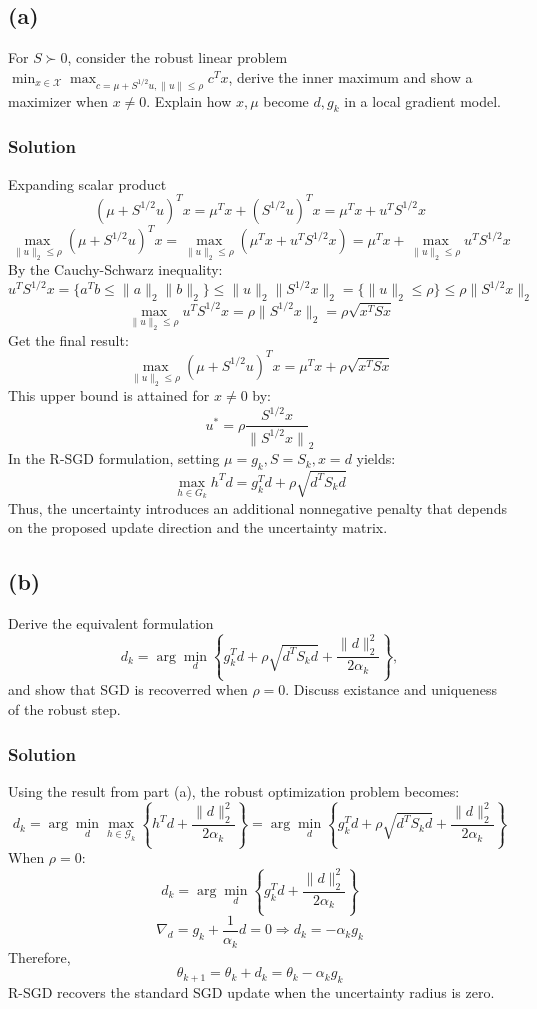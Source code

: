 \subsection{(a)}
For $S \succ 0$, consider the robust linear problem $\min_{x \in \mathcal{X}} \max_{c = \mu + S^{1/2}u, \|u\| \leq \rho} c^T x$, derive the inner maximum and show a maximizer when $x \neq 0$. Explain how $x, \mu$ become $d, g_k$ in a local gradient model.

\subsubsection{Solution}
Expanding scalar product
$$(\mu + S^{1/2} u)^T x = \mu^T x + (S^{1/2} u)^T x = \mu^T x + u^T S^{1/2} x$$
$$\max_{\|u\|_2 \leq \rho} (\mu + S^{1/2} u)^T x = \max_{\|u\|_2 \leq \rho} (\mu^T x + u^T S^{1/2} x) = \mu^T x + \max_{\|u\|_2 \leq \rho} u^T S^{1/2} x$$
By the Cauchy-Schwarz inequality:
$$u^T S^{1/2} x = \{a^T b \leq \|a\|_2 \|b\|_2\} \leq \|u\|_2 \|S^{1/2} x\|_2 = \{\|u\|_2 \leq \rho\} \leq \rho \|S^{1/2} x\|_2$$
$$\max_{\|u\|_2 \leq \rho} u^T S^{1/2} x = \rho \|S^{1/2} x\|_2 = \rho \sqrt{x^T S x}$$
Get the final result:
$$\max_{\|u\|_2 \leq \rho} (\mu + S^{1/2} u)^T x = \mu^T x + \rho \sqrt{x^T S x}$$
This upper bound is attained for $x \neq 0$ by:
$$u^* = \rho \frac{S^{1/2}x}{\|S^{1/2} x\|}_2$$
In the R-SGD formulation, setting $\mu = g_k, S = S_k, x = d$ yields:
$$\max_{h \in G_k} h^T d = g^T_k d + \rho \sqrt{d^T S_k d}$$
Thus, the uncertainty introduces an additional nonnegative penalty that depends on the proposed update direction and the uncertainty matrix.

\subsection{(b)}
Derive the equivalent formulation
$$d_k = \arg \min_d \left\{g^T_k d + \rho \sqrt{d^T S_k d} + \frac{\|d\|^2_2}{2 \alpha_k}\right\},$$ and show that SGD is recoverred when $\rho = 0$. Discuss existance and uniqueness of the robust step.
\subsubsection{Solution}
Using the result from part (a), the robust optimization problem becomes:
$$d_k = \arg \min_d \max_{h \in \mathcal{G}_k} \left\{h^T d + \frac{\|d\|^2_2}{2 \alpha_k}\right\} = \arg \min_d \left\{g^T_k d + \rho \sqrt{d^T S_k d} + \frac{\|d\|^2_2}{2 \alpha_k}\right\}$$
When $\rho = 0$:
$$d_k = \arg \min_d \left\{g^T_k d + \frac{\|d\|^2_2}{2 \alpha_k}\right\}$$
$$\nabla_d = g_k + \frac{1}{\alpha_k} d = 0 \Rightarrow d_k = -\alpha_k g_k$$
Therefore,
$$\theta_{k+1} = \theta_k + d_k = \theta_k - \alpha_k g_k$$
R-SGD recovers the standard SGD update when the uncertainty radius is zero.

